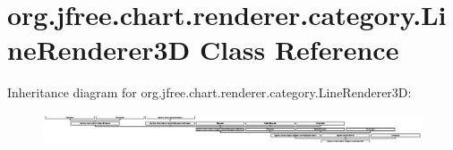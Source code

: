 \hypertarget{classorg_1_1jfree_1_1chart_1_1renderer_1_1category_1_1_line_renderer3_d}{}\section{org.\+jfree.\+chart.\+renderer.\+category.\+Line\+Renderer3D Class Reference}
\label{classorg_1_1jfree_1_1chart_1_1renderer_1_1category_1_1_line_renderer3_d}
Inheritance diagram for org.\+jfree.\+chart.\+renderer.\+category.\+Line\+Renderer3D\+:\begin{figure}[H]
\begin{center}
\leavevmode
\includegraphics[height=0.902062cm]{classorg_1_1jfree_1_1chart_1_1renderer_1_1category_1_1_line_renderer3_d}
\end{center}
\end{figure}

